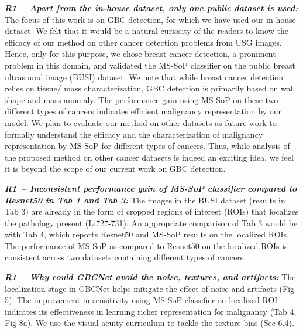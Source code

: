 \documentclass[10pt,twocolumn,letterpaper]{article}
\newcommand{\ra}{\textcolor{Periwinkle}{R1}}
\newcommand{\myfirstpara}[1]{\noindent \textbf{\textit{#1:}}}
\newcommand{\mypara}[1]{\vspace{0.1em} \myfirstpara{#1}}
\begin{document}
\mypara{\ra ~-- Apart from the in-house dataset, only one public dataset is used}
%
The focus of this work is on GBC detection, for which we have used our in-house dataset. We felt that it would be a natural curiosity of the readers to know the efficacy of our method on other cancer detection problems from USG images. Hence, only for this purpose, we chose breast cancer detection, a prominent problem in this domain, and validated the MS-SoP classifier on the public breast ultrasound image (BUSI) dataset. We note that while breast cancer detection relies on tissue/ mass characterization, GBC detection is primarily based on wall shape and mass anomaly. The performance gain using MS-SoP on these two different types of cancers indicates efficient malignancy representation by our model. We plan to evaluate our method on other datasets as future work to formally understand the efficacy and the characterization of malignancy representation by MS-SoP for different types of cancers. Thus, while analysis of the proposed method on other cancer datasets is indeed an exciting idea, we feel it is beyond the scope of our current work on GBC detection.

\mypara{\ra ~-- Inconsistent performance gain of MS-SoP classifier compared to Resnet50 in Tab 1 and Tab 3}
%
The images in the BUSI dataset (results in Tab 3) are already in the form of cropped regions of interest (ROIs) that localizes the pathology present (L:727-731). An appropriate comparison of Tab 3 would be with Tab 4, which reports Resnet50 and MS-SoP results on the localized ROIs. The performance of MS-SoP as compared to Resnet50 on the localized ROIs is consistent across two datasets containing different types of cancers.

\mypara{\ra ~-- Why could GBCNet avoid the noise, textures, and artifacts}
%
The localization stage in GBCNet helps mitigate the effect of noise and artifacts (Fig 5). The improvement in sensitivity using MS-SoP classifier on localized ROI indicates its effectiveness in learning richer representation for malignancy (Tab 4, Fig 8a). We use the visual acuity curriculum to tackle the texture bias (Sec 6.4).
\end{document}
